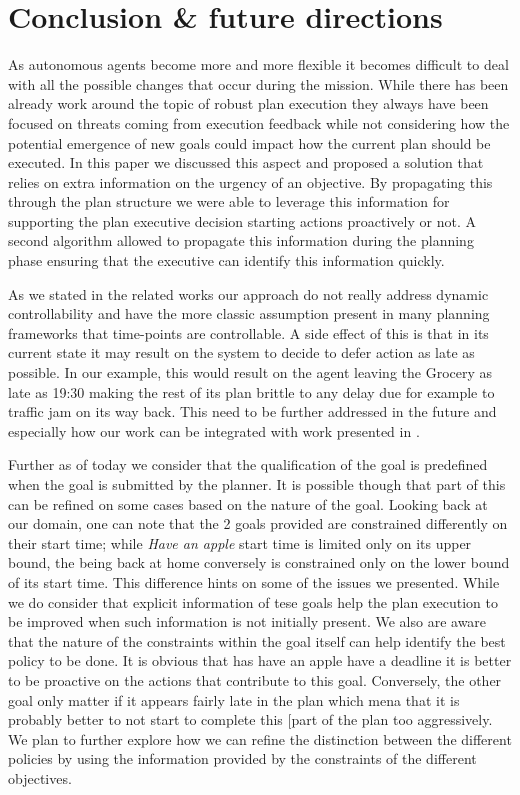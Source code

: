 
\section{Conclusion \& future directions}
\label{sec:conclude}



As autonomous agents become more and more flexible it becomes difficult to deal with all the possible changes that occur during the mission. While there has been already work around the topic of robust plan execution they always have been focused on threats coming from execution feedback while not considering how the potential emergence 
of new goals could impact how the current plan should be executed. In this paper we discussed this aspect and proposed a solution that relies on extra information on the urgency of an objective. By propagating this through the plan structure we were able to 
leverage this information for supporting the plan executive decision starting actions proactively or not. A second algorithm allowed to propagate this information during the planning phase ensuring that the executive can identify this information quickly. 

As we stated in the related works our approach do not really address dynamic 
controllability and have the more classic assumption present in many planning 
frameworks that time-points are controllable. A side effect of this is that in its current state it may result on the system to decide to defer action as late as possible. In our example, this would result on the agent leaving the Grocery as late as 19:30 making the rest of its plan brittle to any delay due for example to traffic jam on its way back. This need to be further addressed in the future and especially how our work can be integrated with work presented in \cite{morris01}. 

Further as of today we consider that the qualification of the goal is predefined when the goal is submitted by the planner. It is possible though that part of this can be refined on some cases based on the nature  of the goal. Looking back at our domain, one can note that the 2 goals provided are constrained differently on their start time; while {\em Have an  apple} start time is limited only on its upper bound, the being back at home conversely is constrained only on the lower bound of its start time. This difference hints on some of the issues we presented. While we do consider that explicit information of tese goals help the plan execution to be improved when such information is not initially present. We also are aware that the nature of the constraints within the goal itself can help identify the best policy to be done. It is obvious that has have an apple have a deadline it is better to be proactive on the actions that contribute to this goal. Conversely, the other goal only matter if it appears fairly late in the plan which mena that it is probably better to not start to complete this [part of the plan too aggressively. We plan to further explore how we can refine the distinction between the different policies by using the information provided by the constraints of the different objectives. 
 

